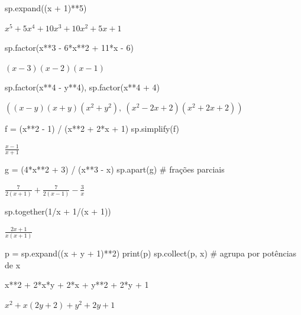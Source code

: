 \begin{entrada}
sp.expand((x + 1)**5)
\end{entrada}
\begin{saidamat}
$\displaystyle x^{5} + 5 x^{4} + 10 x^{3} + 10 x^{2} + 5 x + 1$
\end{saidamat}

\begin{entrada}
sp.factor(x**3 - 6*x**2 + 11*x - 6)
\end{entrada}
\begin{saidamat}
$\displaystyle \left(x - 3\right) \left(x - 2\right) \left(x - 1\right)$
\end{saidamat}

\begin{entrada}
sp.factor(x**4 - y**4), sp.factor(x**4 + 4)
\end{entrada}
\begin{saidamat}
$\displaystyle \left( \left(x - y\right) \left(x + y\right) \left(x^{2} + y^{2}\right), \  \left(x^{2} - 2 x + 2\right) \left(x^{2} + 2 x + 2\right)\right)$
\end{saidamat}

\begin{entrada}
f = (x**2 - 1) / (x**2 + 2*x + 1)
sp.simplify(f)
\end{entrada}
\begin{saidamat}
$\displaystyle \frac{x - 1}{x + 1}$
\end{saidamat}

\begin{entrada}
g = (4*x**2 + 3) / (x**3 - x)
sp.apart(g)                     # frações parciais
\end{entrada}
\begin{saidamat}
$\displaystyle \frac{7}{2 \left(x + 1\right)} + \frac{7}{2 \left(x - 1\right)} - \frac{3}{x}$
\end{saidamat}

\begin{entrada}
sp.together(1/x + 1/(x + 1))
\end{entrada}
\begin{saidamat}
$\displaystyle \frac{2 x + 1}{x \left(x + 1\right)}$
\end{saidamat}

\begin{entrada}
p = sp.expand((x + y + 1)**2)
print(p)
sp.collect(p, x)                # agrupa por potências de x
\end{entrada}
\begin{saida}
x**2 + 2*x*y + 2*x + y**2 + 2*y + 1
\end{saida}
\begin{saidamat}
$\displaystyle x^{2} + x \left(2 y + 2\right) + y^{2} + 2 y + 1$
\end{saidamat}

